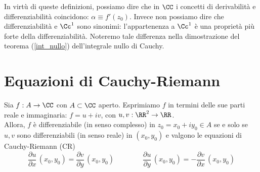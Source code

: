 \begin{rem}
In virtù di queste definizioni, possiamo dire che in $\CC$ i concetti di derivabilità e differenziabilità coincidono: $\alpha\equiv f'(z_0)$. Invece non possiamo dire che differenziabilità e $\Cc^1$ sono sinonimi: l'appartenenza a $\Cc^1$ è una proprietà più forte della differenziabilità. Noteremo tale differenza nella dimostrazione del teorema (\ref{int_nullo}) dell'integrale nullo di Cauchy.
\end{rem}


\section{Equazioni di Cauchy-Riemann}

\begin{thm}
\label{CR}
Sia $f:A\to\CC$ con $A\subset\CC$ aperto. Esprimiamo $f$ in termini delle sue parti reale e immaginaria: $f=u+iv$, con $u,v:\RR^2\to\RR$. \\
Allora, $f$ è differenziabile (in senso complesso) in $z_0=x_0+iy_0\in A$ se e solo se $u,v$ sono differenziabili (in senso reale) in $(x_0,y_0)$ e valgono le equazioni di Cauchy-Riemann (CR)
\begin{equation*}
\boxed{\frac{\partial u}{\partial x}\,(x_0,y_0)=\frac{\partial v}{\partial y}\,(x_0,y_0)} \qquad\qquad \boxed{\frac{\partial u}{\partial y}\,(x_0,y_0)=-\frac{\partial v}{\partial x}\,(x_0,y_0)}
\end{equation*}
\end{thm}

